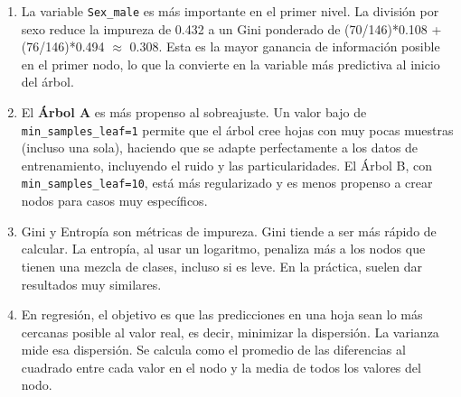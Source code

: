 \documentclass[12pt]{article}
\begin{document}
\begin{enumerate}
  \item La variable \texttt{Sex\_male} es más importante en el primer nivel. La división por sexo reduce la impureza de 0.432 a un Gini ponderado de (70/146)*0.108 + (76/146)*0.494 \(\approx\) 0.308. Esta es la mayor ganancia de información posible en el primer nodo, lo que la convierte en la variable más predictiva al inicio del árbol.

  \item El \textbf{Árbol A} es más propenso al sobreajuste. Un valor bajo de \texttt{min\_samples\_leaf=1} permite que el árbol cree hojas con muy pocas muestras (incluso una sola), haciendo que se adapte perfectamente a los datos de entrenamiento, incluyendo el ruido y las particularidades. El Árbol B, con \texttt{min\_samples\_leaf=10}, está más regularizado y es menos propenso a crear nodos para casos muy específicos.

  \item Gini y Entropía son métricas de impureza. Gini tiende a ser más rápido de calcular. La entropía, al usar un logaritmo, penaliza más a los nodos que tienen una mezcla de clases, incluso si es leve. En la práctica, suelen dar resultados muy similares.

  \item En regresión, el objetivo es que las predicciones en una hoja sean lo más cercanas posible al valor real, es decir, minimizar la dispersión. La varianza mide esa dispersión. Se calcula como el promedio de las diferencias al cuadrado entre cada valor en el nodo y la media de todos los valores del nodo.

\end{enumerate}
\end{document}
